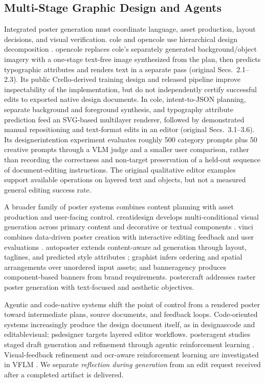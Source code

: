 \subsection{Multi-Stage Graphic Design and Agents}
Integrated poster generation must coordinate language, asset production, layout decisions, and visual verification.
\ac{cole} and \ac{opencole} use hierarchical design decomposition \citep{cole2023,opencole2024}.
\ac{opencole} replaces \ac{cole}'s separately generated background/object imagery with a one-stage text-free image synthesized from the plan, then predicts typographic attributes and renders text in a separate pass (original Secs.~2.1--2.3).
Its public Crello-derived training design and released pipeline improve inspectability of the implementation, but do not independently certify successful edits to exported native design documents.
In \ac{cole}, intent-to-JSON planning, separate background and foreground synthesis, and typography attribute prediction feed an SVG-based multilayer renderer, followed by demonstrated manual repositioning and text-format edits in an editor (original Secs.~3.1--3.6).
Its \ac{designerintention} experiment evaluates roughly 500 category prompts plus 50 creative prompts through a VLM judge and a smaller user comparison, rather than recording the correctness and non-target preservation of a held-out sequence of document-editing instructions.
The original qualitative editor examples support available operations on layered text and objects, but not a measured general editing success rate.

A broader family of poster systems combines content planning with asset production and user-facing control.
\ac{creatidesign} develops multi-conditional visual generation across primary content and decorative or textual components \citep{creatidesign2026}.
\ac{vinci} combines data-driven poster creation with interactive editing feedback and user evaluations \citep{vinci2021}.
\ac{autoposter} extends content-aware ad generation through layout, taglines, and predicted style attributes \citep{autoposter2023}; \ac{graphist} infers ordering and spatial arrangements over unordered input assets; and \ac{banneragency} produces component-based banners from brand requirements.
\ac{postercraft} addresses raster poster generation with text-focused and aesthetic objectives.

Agentic and code-native systems shift the point of control from a rendered poster toward intermediate plans, source documents, and feedback loops.
Code-oriented systems increasingly produce the design document itself, as in \ac{designascode} and \ac{editablevisual}; \ac{psdesigner} targets layered editor workflows.
\ac{posteragent} studies staged draft generation and refinement through agentic reinforcement learning \citep{posteragent2026}.
Visual-feedback refinement and \ac{ocr}-aware reinforcement learning are investigated in VFLM \citep{guo2026visualfeedback}.
We separate \emph{reflection during generation} from an edit request received after a completed artifact is delivered.

